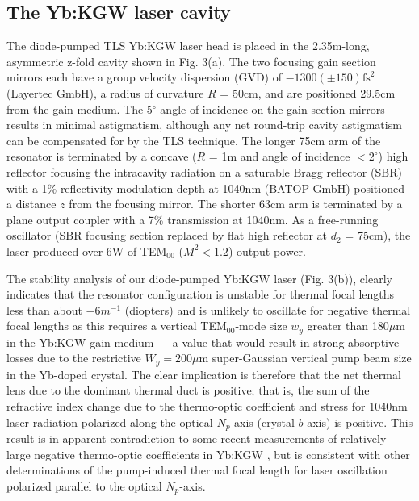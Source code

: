 \subsection{The Yb:KGW laser cavity}

The diode-pumped TLS Yb:KGW laser head is placed in the 2.35m-long, asymmetric z-fold cavity shown in Fig. 3(a).
The two focusing gain section mirrors each have a group velocity dispersion (GVD) of $-1300 ( \pm 150 ) \text{fs}^2$ (Layertec GmbH\cite{website_layertec}), a radius of curvature $R$ = 50cm, and are positioned 29.5cm from the gain medium.
The 5$^\circ$ angle of incidence on the gain section mirrors results in minimal astigmatism, although any net round-trip cavity astigmatism can be compensated for by the TLS technique.
The longer 75cm arm of the resonator is terminated by a concave ($R$ = 1m and angle of incidence $< 2^\circ$) high reflector
focusing the intracavity radiation on a saturable Bragg reflector (SBR) with a 1\% reflectivity modulation depth at 1040nm (BATOP GmbH\cite{website_BATOP}) positioned a distance $z$ from the focusing mirror.
The shorter 63cm arm is terminated by a plane output coupler with a 7\% transmission at 1040nm.
As a free-running oscillator (SBR focusing section replaced by flat high reflector at $d_2$ = 75cm), the laser produced over 6W of TEM$_{00}$ ($M^2 < 1.2$) output power.

The stability analysis of our diode-pumped Yb:KGW laser (Fig. 3(b)), clearly indicates that the resonator configuration is unstable for thermal focal lengths less than about $-6m^{-1}$ (diopters) and is unlikely to oscillate for negative thermal focal lengths as this requires a vertical TEM$_{00}$-mode size $w_y$ greater than 180$\mu$m in the Yb:KGW gain medium --- a value that would result in strong absorptive losses due to the restrictive $W_y = 200\mu$m super-Gaussian vertical pump beam size in the Yb-doped crystal.
The clear implication is therefore that the net thermal lens due to the dominant thermal duct is positive; that is, the sum of the refractive index change due to the thermo-optic coefficient and stress for 1040nm laser radiation polarized along the optical $N_p$-axis (crystal $b$-axis) is positive.
This result is in apparent contradiction to some recent measurements of relatively large negative thermo-optic coefficients in Yb:KGW \cite{Biswal_thermo_optical_05}, but is consistent with other determinations of the pump-induced thermal focal length for laser oscillation polarized parallel to the optical $N_p$-axis\cite{Holtom_mode_locked_2006,Hellstrom_efficient_2006}.

